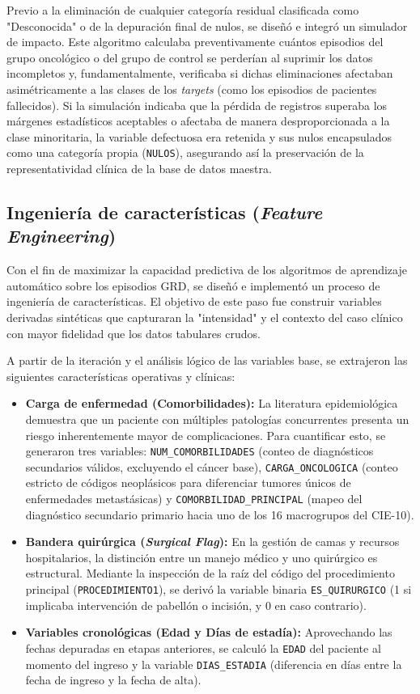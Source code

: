 Previo a la eliminación de cualquier categoría residual clasificada como "Desconocida" o de la depuración final de nulos, se diseñó e integró un simulador de impacto. Este algoritmo calculaba preventivamente cuántos episodios del grupo oncológico o del grupo de control se perderían al suprimir los datos incompletos y, fundamentalmente, verificaba si dichas eliminaciones afectaban asimétricamente a las clases de los \textit{targets} (como los episodios de pacientes fallecidos). Si la simulación indicaba que la pérdida de registros superaba los márgenes estadísticos aceptables o afectaba de manera desproporcionada a la clase minoritaria, la variable defectuosa era retenida y sus nulos encapsulados como una categoría propia (\texttt{NULOS}), asegurando así la preservación de la representatividad clínica de la base de datos maestra.

\subsection{Ingeniería de características (\textit{Feature Engineering})}
Con el fin de maximizar la capacidad predictiva de los algoritmos de aprendizaje automático sobre los episodios GRD, se diseñó e implementó un proceso de ingeniería de características. El objetivo de este paso fue construir variables derivadas sintéticas que capturaran la "intensidad" y el contexto del caso clínico con mayor fidelidad que los datos tabulares crudos. 

A partir de la iteración y el análisis lógico de las variables base, se extrajeron las siguientes características operativas y clínicas:
\begin{itemize}
    \item \textbf{Carga de enfermedad (Comorbilidades):} La literatura epidemiológica demuestra que un paciente con múltiples patologías concurrentes presenta un riesgo inherentemente mayor de complicaciones. Para cuantificar esto, se generaron tres variables: \texttt{NUM\_COMORBILIDADES} (conteo de diagnósticos secundarios válidos, excluyendo el cáncer base), \texttt{CARGA\_ONCOLOGICA} (conteo estricto de códigos neoplásicos para diferenciar tumores únicos de enfermedades metastásicas) y \texttt{COMORBILIDAD\_PRINCIPAL} (mapeo del diagnóstico secundario primario hacia uno de los 16 macrogrupos del CIE-10).
    \item \textbf{Bandera quirúrgica (\textit{Surgical Flag}):} En la gestión de camas y recursos hospitalarios, la distinción entre un manejo médico y uno quirúrgico es estructural. Mediante la inspección de la raíz del código del procedimiento principal (\texttt{PROCEDIMIENTO1}), se derivó la variable binaria \texttt{ES\_QUIRURGICO} (1 si implicaba intervención de pabellón o incisión, y 0 en caso contrario).
    \item \textbf{Variables cronológicas (Edad y Días de estadía):} Aprovechando las fechas depuradas en etapas anteriores, se calculó la \texttt{EDAD} del paciente al momento del ingreso y la variable \texttt{DIAS\_ESTADIA} (diferencia en días entre la fecha de ingreso y la fecha de alta). 
\end{itemize}

